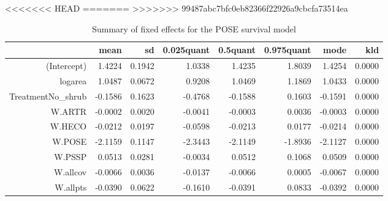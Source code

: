 <<<<<<< HEAD
=======
>>>>>>> 99487abc7bfc0eb82366f22926a9cbcfa73514ea
\begin{table}[ht]
\centering
\caption{Summary of fixed effects for the POSE survival model} 
\label{POSEsurvival}
\begin{tabular}{rrrrrrrr}
  \hline
 & mean & sd & 0.025quant & 0.5quant & 0.975quant & mode & kld \\ 
  \hline
(Intercept) & 1.4224 & 0.1942 & 1.0338 & 1.4235 & 1.8039 & 1.4254 & 0.0000 \\ 
  logarea & 1.0487 & 0.0672 & 0.9208 & 1.0469 & 1.1869 & 1.0433 & 0.0000 \\ 
  TreatmentNo\_shrub & -0.1586 & 0.1623 & -0.4768 & -0.1588 & 0.1603 & -0.1591 & 0.0000 \\ 
  W.ARTR & -0.0002 & 0.0020 & -0.0041 & -0.0003 & 0.0036 & -0.0003 & 0.0000 \\ 
  W.HECO & -0.0212 & 0.0197 & -0.0598 & -0.0213 & 0.0177 & -0.0214 & 0.0000 \\ 
  W.POSE & -2.1159 & 0.1147 & -2.3443 & -2.1149 & -1.8936 & -2.1127 & 0.0000 \\ 
  W.PSSP & 0.0513 & 0.0281 & -0.0034 & 0.0512 & 0.1068 & 0.0509 & 0.0000 \\ 
  W.allcov & -0.0066 & 0.0036 & -0.0137 & -0.0066 & 0.0005 & -0.0067 & 0.0000 \\ 
  W.allpts & -0.0390 & 0.0622 & -0.1610 & -0.0391 & 0.0833 & -0.0392 & 0.0000 \\ 
   \hline
\end{tabular}
\end{table}

